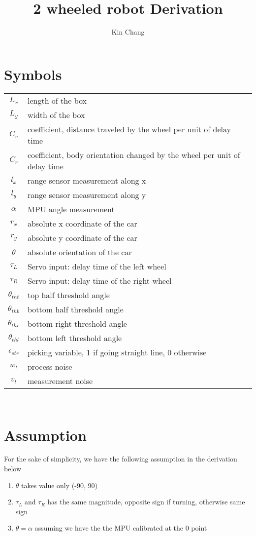 \documentclass[12pt, letterpaper]{amsart} %
\author{Kin Chang}
\title{2 wheeled robot Derivation}
\numberwithin{equation}{section}
\begin{document}
\maketitle
\section{Symbols}
\begin{tabular}{cp{}}
  $L_x$ & length of the box  \\
  $L_y$ & width of the box \\
  $C_v$ & coefficient, distance traveled by the wheel per unit of delay time \\
  $C_r$ & coefficient, body orientation changed by the wheel per unit of delay time \\
  $l_x$ & range sensor measurement along x \\
  $l_y$ & range sensor measurement along y \\
  $\alpha$ & MPU angle measurement \\
  $r_x$ & absolute x coordinate of the car \\
  $r_y$ & absolute y coordinate of the car \\
  $\theta$ & absolute orientation of the car \\
  $\tau_L$ & Servo input: delay time of the left wheel \\
  $\tau_R$ & Servo input: delay time of the right wheel \\
  $\theta_{tht}$ & top half threshold angle \\
  $\theta_{thb}$ & bottom half threshold angle \\
  $\theta_{thr}$ & bottom right threshold angle \\
  $\theta_{thl}$ & bottom left threshold angle \\
  $\epsilon_{str}$ & picking variable, 1 if going straight line, 0 otherwise \\
  $w_t$ & process noise \\
  $v_t$ & measurement noise
\end{tabular}\\
\section{Assumption}
For the sake of simplicity, we have the following assumption in the derivation below
\begin{enumerate}
\item $\theta$ takes value only (-90, 90)
\item $\tau_L$ and $\tau_R$ has the same magnitude, opposite sign if turning, otherwise same sign 
\item $\theta = \alpha$ assuming we have the the MPU calibrated at the 0 point
\end{enumerate}  
\end{document}
